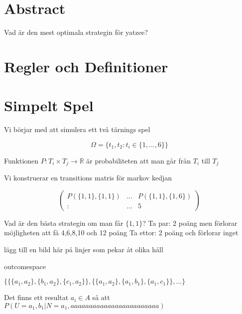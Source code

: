 \documentclass[a4paper,12pt]{article}
\begin{document}
\section{Abstract}
Vad är den mest optimala strategin för yatzee?

\section{Regler och Definitioner}



\section{Simpelt Spel}
Vi börjar med att simulera ett två tärnings spel

\begin{equation}
    \Omega=\{t_1,t_2:t_i\in\{1,...,6\}\}
\end{equation}

Funktionen $P:T_i\times T_j \rightarrow \mathds{R}$ är probabiliteten att man går från $T_i$ till $T_j$


Vi konstruerar en transitions matris för markov kedjan

$$
\begin{pmatrix}
    P(\{1,1\},\{1,1\})&...&P(\{1,1\},\{1,6\})\\
    :&...&5
\end{pmatrix}
$$

Vad är den bästa strategin om man får $\{1,1\}$?
Ta par: 2 poäng men förlorar möjligheten att få 4,6,8,10 och 12 poäng
Ta ettor: 2 poäng och förlorar inget

lägg till en bild här på linjer som pekar åt olika håll

outcomespace

$\{\{\{a_1,a_2\},\{b_1,a_2\},\{c_1,a_2\}\},\{\{a_1,a_2\},\{a_1,b_1\},\{a_1,c_1\}\},...\}$

Det finns ett resultat $a_i\in A$ så att 
$P(U={a_1,b_1}|N={a_1,aaaaaaaaaaaaaaaaaaaaaaaa})$
\end{document}
